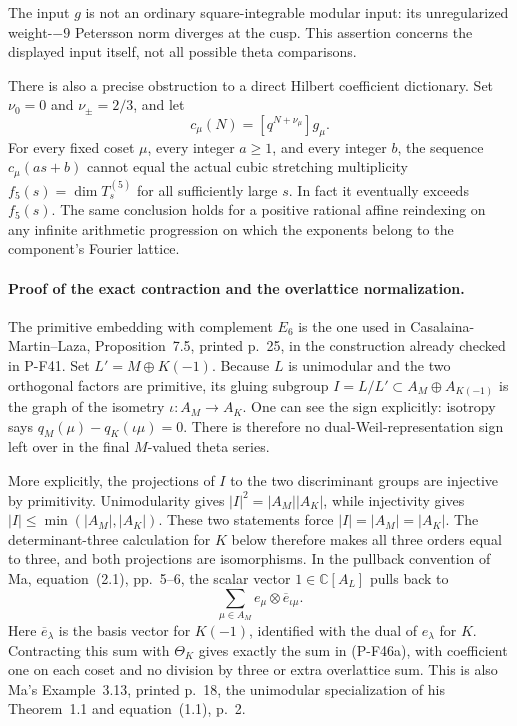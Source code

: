 The input $g$ is not an ordinary square-integrable modular
input: its unregularized weight-$-9$ Petersson norm
diverges at the cusp. This assertion concerns the displayed
input itself, not all possible theta comparisons.

There is also a precise obstruction to a direct Hilbert
coefficient dictionary. Set $\nu_0=0$ and
$\nu_\pm=2/3$, and let
\[
                  c_\mu(N)=[q^{N+\nu_\mu}]g_\mu.
\]
For every fixed coset $\mu$, every integer $a\ge1$,
and every integer $b$, the sequence $c_\mu(as+b)$
cannot equal the actual cubic stretching multiplicity
$f_5(s)=\dim T^{(5)}_s$ for all sufficiently large $s$.
In fact it eventually exceeds $f_5(s)$. The same conclusion
holds for a positive rational affine reindexing on any
infinite arithmetic progression on which the exponents
belong to the component's Fourier lattice.

\paragraph{Proof of the exact contraction and the overlattice normalization.}
The primitive embedding with complement $E_6$ is the one
used in Casalaina-Martin--Laza, Proposition~7.5, printed
p.~25, in the construction already checked in P-F41.
Set $L'=M\oplus K(-1)$. Because $L$ is unimodular and
the two orthogonal factors are primitive, its gluing
subgroup
$I=L/L'\subset A_M\oplus A_{K(-1)}$
is the graph of the isometry $\iota:A_M\to A_K$.
One can see the sign explicitly: isotropy says
$q_M(\mu)-q_K(\iota\mu)=0$. There is therefore no
dual-Weil-representation sign left over in the final
$M$-valued theta series.

More explicitly, the projections of $I$ to the two
discriminant groups are injective by primitivity.
Unimodularity gives $|I|^2=|A_M||A_K|$, while
injectivity gives $|I|\le\min(|A_M|,|A_K|)$.
These two statements force $|I|=|A_M|=|A_K|$.
The determinant-three calculation for $K$ below
therefore makes all three orders equal to three,
and both projections are isomorphisms.
In the pullback convention of Ma, equation~(2.1),
pp.~5--6, the scalar vector $1\in\mathbb C[A_L]$
pulls back to
\[
                  \sum_{\mu\in A_M}
                      e_\mu\otimes\overline e_{\iota\mu}.
 \tag{P-F46e}
\]
Here $\overline e_\lambda$ is the basis vector for
$K(-1)$, identified with the dual of $e_\lambda$ for
$K$. Contracting this sum with $\Theta_K$ gives
exactly the sum in (P-F46a), with coefficient one
on each coset and no division by three or extra
overlattice sum. This is also Ma's Example~3.13,
printed p.~18, the unimodular specialization of
his Theorem~1.1 and equation~(1.1), p.~2.

